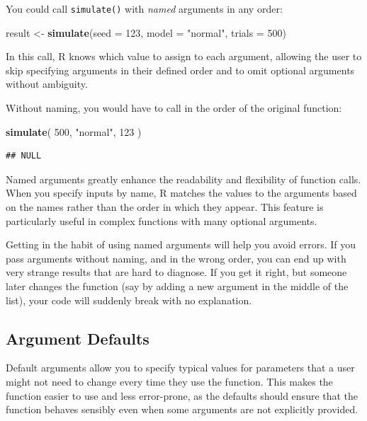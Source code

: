 \documentclass[
]{book}
\newenvironment{Shaded}{\begin{snugshade}}{\end{snugshade}}
\newcommand{\AttributeTok}[1]{\textcolor[rgb]{0.13,0.29,0.53}{#1}}
\newcommand{\DecValTok}[1]{\textcolor[rgb]{0.00,0.00,0.81}{#1}}
\newcommand{\FunctionTok}[1]{\textcolor[rgb]{0.13,0.29,0.53}{\textbf{#1}}}
\newcommand{\NormalTok}[1]{#1}
\newcommand{\OtherTok}[1]{\textcolor[rgb]{0.56,0.35,0.01}{#1}}
\newcommand{\StringTok}[1]{\textcolor[rgb]{0.31,0.60,0.02}{#1}}
\begin{document}
You could call \texttt{simulate()} with \emph{named} arguments in any order:

\begin{Shaded}
\begin{Highlighting}[]
\NormalTok{result }\OtherTok{\textless{}{-}} \FunctionTok{simulate}\NormalTok{(}\AttributeTok{seed =} \DecValTok{123}\NormalTok{, }\AttributeTok{model =} \StringTok{"normal"}\NormalTok{, }\AttributeTok{trials =} \DecValTok{500}\NormalTok{)}
\end{Highlighting}
\end{Shaded}

In this call, R knows which value to assign to each argument, allowing the user to skip specifying arguments in their defined order and to omit optional arguments without ambiguity.

Without naming, you would have to call in the order of the original function:

\begin{Shaded}
\begin{Highlighting}[]
\FunctionTok{simulate}\NormalTok{( }\DecValTok{500}\NormalTok{, }\StringTok{"normal"}\NormalTok{, }\DecValTok{123}\NormalTok{ )}
\end{Highlighting}
\end{Shaded}

\begin{verbatim}
## NULL
\end{verbatim}

Named arguments greatly enhance the readability and flexibility of function calls.
When you specify inputs by name, R matches the values to the arguments based on the names rather than the order in which they appear. This feature is particularly useful in complex functions with many optional arguments.

Getting in the habit of using named arguments will help you avoid errors.
If you pass arguments without naming, and in the wrong order, you can end up with very strange results that are hard to diagnose.
If you get it right, but someone later changes the function (say by adding a new argument in the middle of the list), your code will suddenly break with no explanation.

\subsection{Argument Defaults}\label{argument-defaults}

Default arguments allow you to specify typical values for parameters that a user might not need to change every time they use the function.
This makes the function easier to use and less error-prone, as the defaults should ensure that the function behaves sensibly even when some arguments are not explicitly provided.
\end{document}
